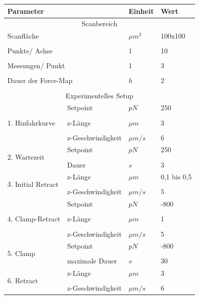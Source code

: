 \begin{table}[H]
	\centering
	\keepXColumns
	\begin{tabularx}{\textwidth}{X X X X}
		\multicolumn{2}{l}{\textbf{Parameter}}	&	\textbf{Einheit}	&	\textbf{Wert}	\\
		\toprule
		\toprule
		\multicolumn{4}{c}{Scanbereich}	\\
		\toprule
		\multicolumn{2}{l}{Scanfläche}	&	$\mu m^2$	&	100x100	\\
		&&&\\
		\multicolumn{2}{l}{Punkte/ Achse}	&	1	&	10	\\
		&&&\\
		\multicolumn{2}{l}{Messungen/ Punkt}	&	1	&	3	\\
		&&&\\
		\multicolumn{2}{l}{Dauer der Force-Map}	&	$h$	&	2	\\
		&&&\\
		\toprule
		\multicolumn{4}{c}{Experimentelles Setup}	\\
		\toprule
		\multirow{5}{3cm}{1. Hinfahrkurve}	&	Setpoint	&	$pN$	&	250	\\
		&&&\\
		&	z-Länge	&	$\mu m$	&	3	\\
		&&&\\
		&	z-Geschwindigkeit	&	$\mu m/s$	&	6	\\
		\toprule
		\multirow{3}{3cm}{2. Wartezeit}	&	Setpoint	&	$pN$	&	250	\\
		&&&\\
		&	Dauer	&	$s$	&	3	\\
		\toprule
		\multirow{3}{3cm}{3. Initial Retract}	&	z-Länge	&	$\mu m$	&	0,1 bis 0,5	\\
		&&&\\
		&	z-Geschwindigkeit	&	$\mu m/s$	&	5	\\
		\toprule
		\multirow{5}{3cm}{4. Clamp-Retract}	&	Setpoint	&	$pN$	&	-800	\\
		&&&\\
		&	z-Länge	&	$\mu m$	&	1	\\
		&&&\\
		&	z-Geschwindigkeit	&	$\mu m/s$	&	5	\\
		\toprule
		\multirow{3}{3cm}{5. Clamp}	&	Setpoint	&	$pN$	&	-800	\\
		&&&\\
		&	maximale Dauer	&	$s$	&	30	\\
		\toprule
		\multirow{3}{3cm}{6. Retract}	&	z-Länge	&	$\mu m$	&	3	\\
		&&&\\
		&	z-Geschwindigkeit	&	$\mu m/s$	&	6	\\
		\toprule
		\toprule
	\end{tabularx}
	\label{tab:force-clamp-parameter}
\end{table}

